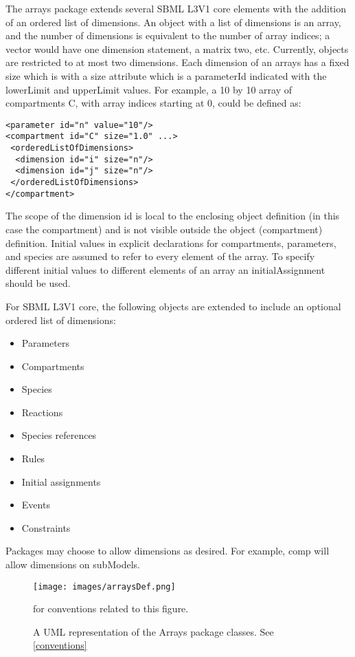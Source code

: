 The arrays package extends several SBML L3V1 core elements with the addition of an ordered list of dimensions.  An object with a list of dimensions is an array, and the number of dimensions is equivalent to the number of array indices; a vector would have one dimension statement, a matrix two, etc.  Currently, objects are restricted to at most two dimensions.  Each dimension of an arrays has a fixed size which is with a size attribute which is a parameterId indicated with the lowerLimit and upperLimit values.  For example, a 10 by 10 array of compartments C, with array indices starting at 0, could be defined as:
\begin{verbatim} 
<parameter id="n" value="10"/>
<compartment id="C" size="1.0" ...>
 <orderedListOfDimensions>
  <dimension id="i" size="n"/>
  <dimension id="j" size="n"/>
 </orderedListOfDimensions>
</compartment>
\end{verbatim}
The scope of the dimension id is local to the enclosing object definition  (in this case the compartment) and is not visible outside the object  (compartment) definition.  
Initial values in explicit declarations for compartments, parameters, and species are assumed to refer to every element of the array.  To specify different initial values to different elements of an array an initialAssignment should be used. 

For SBML L3V1 core, the following objects are extended to include an optional ordered list of dimensions:
\begin{itemize}
\item Parameters
\item Compartments
\item Species
\item Reactions
\item Species references
\item Rules
\item Initial assignments
\item Events
\item Constraints
\end{itemize}
Packages may choose to allow dimensions as desired.  For example, comp will allow dimensions on subModels.

\begin{figure}[h]
  \centering
  \texttt{[image: images/arraysDef.png]}\\
  \caption{A UML representation of the Arrays package classes. See \ref{conventions}} for conventions related to this figure. \label{fig:fbc_uml}
\end{figure}

